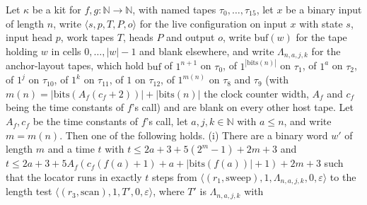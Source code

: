 \begin{theorem}
\label{Turing.NTimeDiag.qy_rnd_call}
\leanok
{}
Let $\kappa$ be a kit for $f, g : \mathbb{N} \to \mathbb{N}$, with named tapes $\tau_0, \dots,
\tau_{15}$, let $x$ be a binary input of length $n$, write $\langle s, p, T, P, o\rangle$ for the
live configuration on input $x$ with state $s$, input head $p$, work tapes $T$, heads $P$ and
output $o$, write $\mathrm{buf}(w)$ for the tape holding $w$ in cells $0, \dots, |w| - 1$ and blank
elsewhere, and write $\Lambda_{n,a,j,k}$ for the anchor-layout tapes, which hold $\mathrm{buf}$ of
$1^{n+1}$ on $\tau_0$, of $1^{|\mathrm{bits}(n)|}$ on $\tau_1$, of $1^a$ on $\tau_2$, of $1^j$ on
$\tau_{10}$, of $1^k$ on $\tau_{11}$, of $1$ on $\tau_{12}$, of $1^{m(n)}$ on $\tau_8$ and $\tau_9$
(with $m(n) = |\mathrm{bits}(A_f(c_f + 2))| + |\mathrm{bits}(n)|$ the clock counter width, $A_f$
and $c_f$ being the time constants of $f$'s call) and are blank on every other host tape. Let $A_f,
c_f$ be the time constants of $f$'s call, let $a, j, k \in \mathbb{N}$ with $a \le n$, and write $m
= m(n)$. Then one of the following holds. (i) There are a binary word $w'$ of length $m$ and a time
$t$ with $t \le 2a + 3 + 5(2^m - 1) + 2m + 3$ and $t \le 2a + 3 + 5A_f(c_f(f(a) + 1) + a +
|\mathrm{bits}(f(a))| + 1) + 2m + 3$ such that the locator runs in exactly $t$ steps from $\langle
(r_1, \mathrm{sweep}), 1, \Lambda_{n,a,j,k}, 0, \varepsilon\rangle$ to the length test $\langle
(r_3, \mathrm{scan}), 1, T', 0, \varepsilon \rangle$, where $T'$ is $\Lambda_{n,a,j,k}$ with

\end{theorem}
